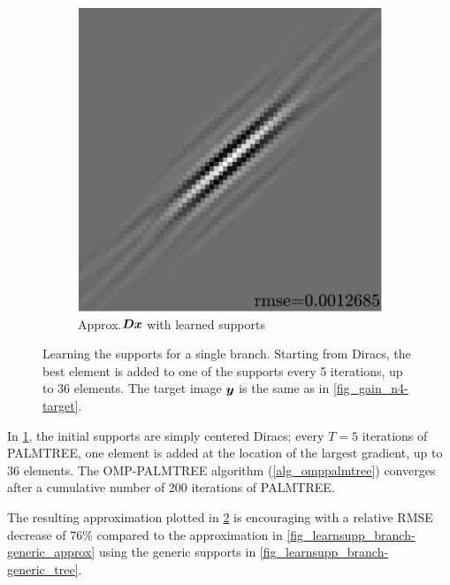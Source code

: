 \begin{figure}[!ht]
\begin{subfigure}[b]{0.085\textwidth}
\caption{}\label{fig_learnsupp_branch-learned_tree}
\end{subfigure}
\begin{subfigure}[b]{0.39\textwidth}\centering
\includegraphics[width=\textwidth]{figures/variable_support/xp_128x128_sc2_angl1_K3_S3_node4_variable_approx.pdf}
\caption{Approx.\@ $\bm{D}\bm{x}$ with learned supports}\label{fig_learnsupp_branch-learned_approx}
\end{subfigure}
\caption{Learning the supports for a single branch. Starting from Diracs, the best element is added to one of the supports every 5 iterations, up to 36 elements. The target image $\bm{y}$ is the same as in \cref{fig_gain_n4-target}.}\label{fig_learnsupp_branch}
\end{figure}

\noindent
In \cref{fig_learnsupp_branch-learned_tree}, the initial supports are simply centered Diracs; every $T=5$ iterations of \ac{PALMTREE}, one element is added at the location of the largest gradient, up to 36 elements. The OMP-PALMTREE algorithm (\cref{alg_omppalmtree}) converges after a cumulative number of 200 iterations of \ac{PALMTREE}.

\noindent
The resulting approximation plotted in \cref{fig_learnsupp_branch-learned_approx} is encouraging with a relative RMSE decrease of 76\% compared to the approximation in \cref{fig_learnsupp_branch-generic_approx} using the generic supports in \cref{fig_learnsupp_branch-generic_tree}.


